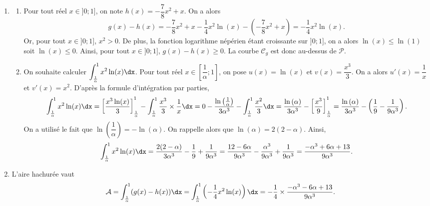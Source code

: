 \documentclass[11pt,fleqn, openany]{book} %
\begin{document}
\begin{solution}
\begin{enumerate}
\item \begin{enumerate}
\item Pour tout réel $x\in]0;1]$, on note $h(x)=-\dfrac{7}{8}x^2+x$. On a alors
\[g(x)-h(x)=-\dfrac{7}{8}x^2+x-\dfrac{1}{4}x^2\ln(x)-\left(-\dfrac{7}{8}x^2+x\right)=-\dfrac{1}{4}x^2\ln(x).\]
Or, pour tout $x\in]0;1]$, $x^2>0$. De plus, la fonction logarithme népérien étant croissante sur $]0;1]$, on a alors $\ln(x)\leqslant \ln(1)$ soit $\ln(x)\leqslant 0$. Ainsi, pour tout $x\in ]0;1]$, $g(x)-h(x)\geqslant 0$. La courbe $\mathcal{C}_g$ est donc au-dessus de $\mathcal{P}$.
\item On souhaite calculer $\displaystyle\int_{\frac{1}{\alpha}}^1 x^2 \ln(x) \dx$. Pour tout réel $x\in \left[\dfrac{1}{\alpha} ; 1 \right]$, on pose $u(x)=\ln(x)$ et $v(x)=\dfrac{x^3}{3}$. On a alors $u'(x)=\dfrac{1}{x}$ et $v'(x)=x^2$. D'après la formule d'intégration par parties, 
\[\displaystyle\int_{\frac{1}{\alpha}}^1 x^2 \ln(x) \dx = \left[ \dfrac{x^3\ln(x)}{3}\right]_{\frac{1}{\alpha}}^1-\displaystyle\int_{\frac{1}{\alpha}}^1 \dfrac{x^3}{3} \times \dfrac{1}{x}\dx=0-\dfrac{\ln\left(\frac{1}{\alpha}\right)}{3\alpha ^3}-\displaystyle\int_{\frac{1}{\alpha}}^1 \dfrac{x^2}{3}\dx = \dfrac{\ln\left(\alpha\right)}{3\alpha ^3}-\left[\dfrac{x^3}{9}\right]_{\frac{1}{\alpha}}^1=\dfrac{\ln\left(\alpha\right)}{3\alpha ^3} - \left( \dfrac{1}{9} - \dfrac{1}{9\alpha ^3}\right).\]
On a utilisé le fait que $\ln\left(\dfrac{1}{\alpha}\right)=-\ln(\alpha)$. On rappelle alors que $\ln(\alpha)=2(2-\alpha)$. Ainsi,
\[\displaystyle\int_{\frac{1}{\alpha}}^1 x^2 \ln(x) \dx=\dfrac{2(2-\alpha)}{3\alpha ^3}-\dfrac{1}{9}+\dfrac{1}{9 \alpha ^3}=\dfrac{12-6\alpha}{9\alpha^3}-\dfrac{\alpha ^3}{9\alpha^3}+\dfrac{1}{9 \alpha^3} = \dfrac{-\alpha ^3 + 6\alpha + 13}{9\alpha ^3}.\]
\end{enumerate}
\item L'aire hachurée vaut \[\mathcal{A}=\int_{\frac{1}{\alpha}}^1(g(x)-h(x))\dx=\int_{\frac{1}{\alpha}}^1\left(-\dfrac{1}{4}x^2\ln(x)\right)\dx=-\dfrac{1}{4} \times \dfrac{-\alpha^3-6\alpha+13}{9\alpha ^3}.\]
\end{enumerate}


\end{solution}
\end{document}
